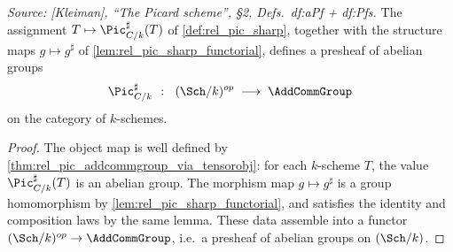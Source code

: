 \begin{theorem}
  \label{thm:rel_pic_sharp_presheaf}

  \textit{Source: [Kleiman], ``The Picard scheme'', \S 2,
  Defs.~df:aPf + df:Pfs.}
  The assignment \(T \mapsto \Pic^\sharp_{C/k}(T)\) of \cref{def:rel_pic_sharp},
  together with the structure maps \(g \mapsto g^\sharp\) of
  \cref{lem:rel_pic_sharp_functorial}, defines a presheaf of abelian groups
  \[
    \Pic^\sharp_{C/k} \;\;\colon\;\; (\Sch/k)^{op} \;\longrightarrow\;
                                     \AddCommGroup
  \]
  on the category of \(k\)-schemes.
\end{theorem}

\begin{proof}




\leanok
  The object map is well defined by
  \cref{thm:rel_pic_addcommgroup_via_tensorobj}: for each \(k\)-scheme
  \(T\), the value \(\Pic^\sharp_{C/k}(T)\) is an abelian group. The
  morphism map \(g \mapsto g^\sharp\) is a group homomorphism by
  \cref{lem:rel_pic_sharp_functorial}, and satisfies the identity and
  composition laws by the same lemma. These data assemble into a functor
  \((\Sch/k)^{op} \to \AddCommGroup\), i.e.\ a presheaf of abelian groups on
  \((\Sch/k)\).
\end{proof}

